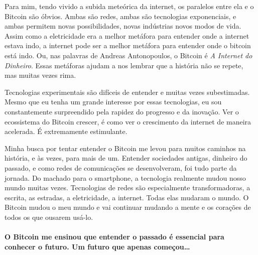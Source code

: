 Para mim, tendo vivido a subida meteórica da internet, os paralelos 
entre ela e o Bitcoin são óbvios. Ambas são redes, ambas são tecnologias 
exponenciais, e ambas permitem novas possibilidades, novas indústrias 
novos modos de vida. Assim como a eletricidade era a melhor metáfora 
para entender onde a internet estava indo, a internet pode ser a melhor 
metáfora para entender onde o bitcoin está indo. Ou, nas palavras de 
Andreas Antonopoulos, o Bitcoin é \textit{A Internet do Dinheiro}.
Essas metáforas ajudam a nos lembrar que a história não se repete, mas muitas vezes rima.

Tecnologias experimentais são difíceis de entender e muitas vezes subestimadas.
Mesmo que eu tenha um grande interesse por essas tecnologias, eu sou constantemente 
surpreendido pela rapidez do progresso e da inovação. Ver o ecossistema do Bitcoin crescer, 
é como ver o crescimento da internet de maneira acelerada. É extremamente estimulante.

Minha busca por tentar entender o Bitcoin me levou para muitos caminhos na história, e às vezes, para mais de um.
Entender sociedades antigas, dinheiro do passado, e como redes de comunicações se desenvolveram, 
foi tudo parte da jornada. Do machado para o smartphone, a tecnologia realmente mudou nosso mundo muitas vezes.
Tecnologias de redes são especialmente transformadoras, a escrita, as estradas, a eletricidade, a internet. 
Todas elas mudaram o mundo. O Bitcoin mudou o meu mundo e vai continuar mudando a mente e os corações 
de todos os que ousarem usá-lo.

\paragraph{O Bitcoin me ensinou que entender o passado é essencial para conhecer o futuro. Um futuro que apenas começou\ldots}

